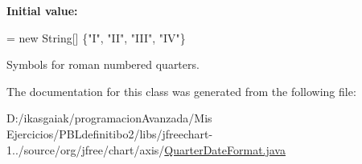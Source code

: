 {\bfseries Initial value\+:}
\begin{DoxyCode}
= \textcolor{keyword}{new} String[] \{\textcolor{stringliteral}{"I"}, \textcolor{stringliteral}{"II"},
            \textcolor{stringliteral}{"III"}, \textcolor{stringliteral}{"IV"}\}
\end{DoxyCode}
Symbols for roman numbered quarters. 

The documentation for this class was generated from the following file\+:\begin{DoxyCompactItemize}
\item 
D\+:/ikasgaiak/programacion\+Avanzada/\+Mis Ejercicios/\+P\+B\+Ldefinitibo2/libs/jfreechart-\/1../source/org/jfree/chart/axis/\mbox{\hyperlink{_quarter_date_format_8java}{Quarter\+Date\+Format.\+java}}\end{DoxyCompactItemize}
